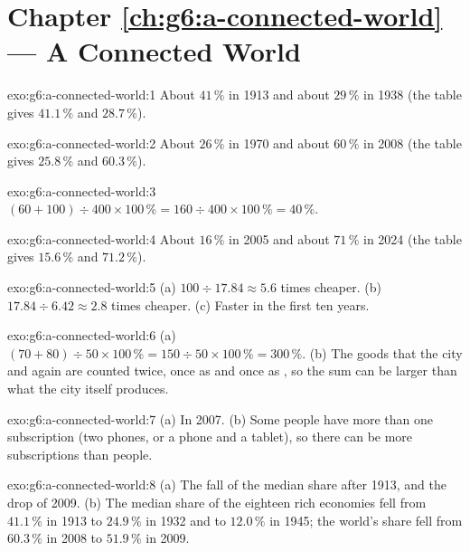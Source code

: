 \section*{Chapter \ref{ch:g6:a-connected-world} --- A Connected World}

\begin{solution}{exo:g6:a-connected-world:1}
About $41\,\%$ in 1913 and about $29\,\%$ in 1938 (the table gives $41.1\,\%$ and
$28.7\,\%$).
\end{solution}

\begin{solution}{exo:g6:a-connected-world:2}
About $26\,\%$ in 1970 and about $60\,\%$ in 2008 (the table gives $25.8\,\%$ and
$60.3\,\%$).
\end{solution}

\begin{solution}{exo:g6:a-connected-world:3}
$(60 + 100) \div 400 \times 100\,\% = 160 \div 400 \times 100\,\% = 40\,\%$.
\end{solution}

\begin{solution}{exo:g6:a-connected-world:4}
About $16\,\%$ in 2005 and about $71\,\%$ in 2024 (the table gives $15.6\,\%$ and
$71.2\,\%$).
\end{solution}

\begin{solution}{exo:g6:a-connected-world:5}
(a) $100 \div 17.84 \approx 5.6$ times cheaper. (b) $17.84 \div 6.42 \approx 2.8$ times
cheaper. (c) Faster in the first ten years.
\end{solution}

\begin{solution}{exo:g6:a-connected-world:6}
(a) $(70 + 80) \div 50 \times 100\,\% = 150 \div 50 \times 100\,\% = 300\,\%$. (b) The
goods that the city  and  again are counted twice, once as  and
once as , so the sum can be larger than what the city itself produces.
\end{solution}

\begin{solution}{exo:g6:a-connected-world:7}
(a) In 2007. (b) Some people have more than one subscription (two phones, or a phone
and a tablet), so there can be more subscriptions than people.
\end{solution}

\begin{solution}{exo:g6:a-connected-world:8}
(a) The fall of the median share after 1913, and the drop of 2009. (b) The median
share of the eighteen rich economies fell from $41.1\,\%$ in 1913 to $24.9\,\%$ in 1932
and to $12.0\,\%$ in 1945; the world's share fell from $60.3\,\%$ in 2008 to $51.9\,\%$
in 2009.
\end{solution}

